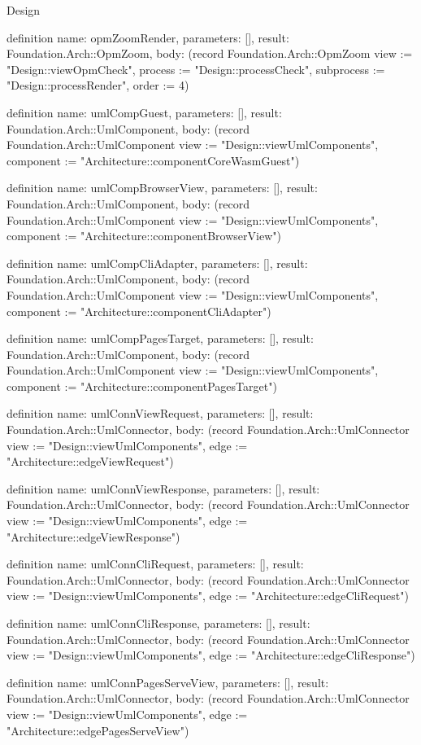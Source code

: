 \begin{lexlean}{Design}
\begin{semanticmodule}
definition{
  name: opmZoomRender,
  parameters: [],
  result: Foundation.Arch::OpmZoom,
  body: (record Foundation.Arch::OpmZoom {view := "Design::viewOpmCheck", process := "Design::processCheck", subprocess := "Design::processRender", order := 4})
}

definition{
  name: umlCompGuest,
  parameters: [],
  result: Foundation.Arch::UmlComponent,
  body: (record Foundation.Arch::UmlComponent {view := "Design::viewUmlComponents", component := "Architecture::componentCoreWasmGuest"})
}

definition{
  name: umlCompBrowserView,
  parameters: [],
  result: Foundation.Arch::UmlComponent,
  body: (record Foundation.Arch::UmlComponent {view := "Design::viewUmlComponents", component := "Architecture::componentBrowserView"})
}

definition{
  name: umlCompCliAdapter,
  parameters: [],
  result: Foundation.Arch::UmlComponent,
  body: (record Foundation.Arch::UmlComponent {view := "Design::viewUmlComponents", component := "Architecture::componentCliAdapter"})
}

definition{
  name: umlCompPagesTarget,
  parameters: [],
  result: Foundation.Arch::UmlComponent,
  body: (record Foundation.Arch::UmlComponent {view := "Design::viewUmlComponents", component := "Architecture::componentPagesTarget"})
}

definition{
  name: umlConnViewRequest,
  parameters: [],
  result: Foundation.Arch::UmlConnector,
  body: (record Foundation.Arch::UmlConnector {view := "Design::viewUmlComponents", edge := "Architecture::edgeViewRequest"})
}

definition{
  name: umlConnViewResponse,
  parameters: [],
  result: Foundation.Arch::UmlConnector,
  body: (record Foundation.Arch::UmlConnector {view := "Design::viewUmlComponents", edge := "Architecture::edgeViewResponse"})
}

definition{
  name: umlConnCliRequest,
  parameters: [],
  result: Foundation.Arch::UmlConnector,
  body: (record Foundation.Arch::UmlConnector {view := "Design::viewUmlComponents", edge := "Architecture::edgeCliRequest"})
}

definition{
  name: umlConnCliResponse,
  parameters: [],
  result: Foundation.Arch::UmlConnector,
  body: (record Foundation.Arch::UmlConnector {view := "Design::viewUmlComponents", edge := "Architecture::edgeCliResponse"})
}

definition{
  name: umlConnPagesServeView,
  parameters: [],
  result: Foundation.Arch::UmlConnector,
  body: (record Foundation.Arch::UmlConnector {view := "Design::viewUmlComponents", edge := "Architecture::edgePagesServeView"})
}


\end{semanticmodule}
\end{lexlean}
